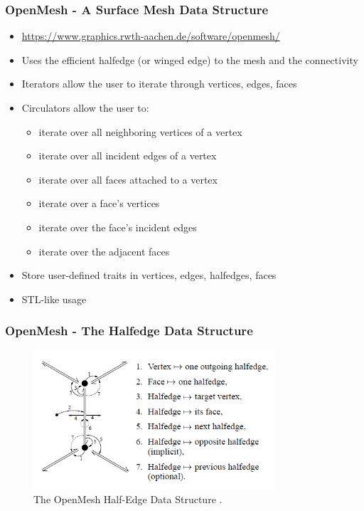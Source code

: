 \begin{frame}
\frametitle{OpenMesh - A Surface Mesh Data Structure}
\begin{itemize}
\item \url{https://www.graphics.rwth-aachen.de/software/openmesh/}
\item Uses the efficient halfedge (or winged edge) to the mesh and the connectivity
\item Iterators allow the user to iterate through vertices, edges, faces
\item Circulators allow the user to:
\begin{itemize}
\item iterate over all neighboring vertices of a vertex
\item iterate over all incident edges of a vertex
\item iterate over all faces attached to a vertex
\item iterate over a face's vertices
\item iterate over the face's incident edges
\item iterate over the adjacent faces
\end{itemize}
\item Store user-defined traits in vertices, edges, halfedges, faces	
\item STL-like usage
\end{itemize}								
\end{frame}

\begin{frame}
\frametitle{OpenMesh - The Halfedge Data Structure}
\begin{figure}[h!]
 \includegraphics[width=0.8\textwidth]{screenshots/half-edge.png}
\caption{The OpenMesh Half-Edge Data Structure \cite{kobbelt2002openmesh}.}
\end{figure}
\end{frame}

